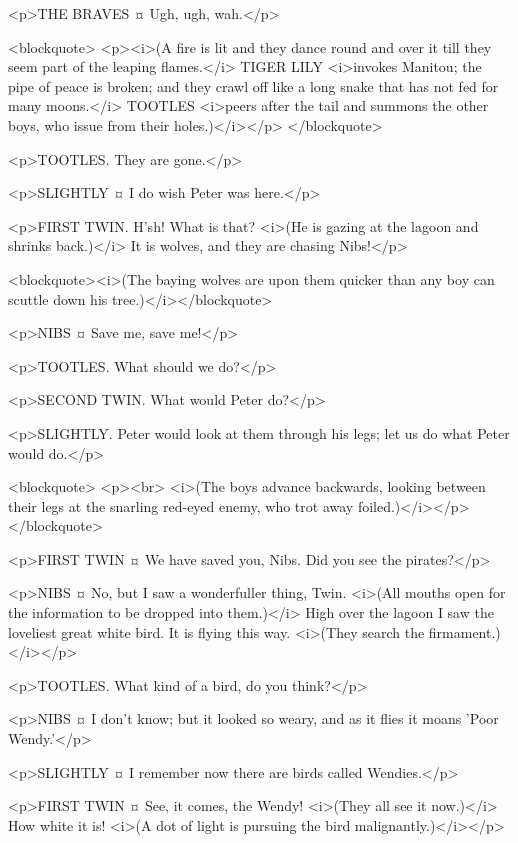 <p>THE BRAVES ¤
Ugh, ugh, wah.</p>

<blockquote> <p><i>(A fire is lit and they dance round and over it till they seem part of the leaping flames.</i> TIGER LILY <i>invokes Manitou; the pipe of peace is broken; and they crawl off like a long snake that has not fed for many moons.</i> TOOTLES <i>peers after the tail and summons the other boys, who issue from their holes.)</i></p> </blockquote>

<p>TOOTLES. They are gone.</p>

<p>SLIGHTLY ¤
I do wish Peter was here.</p>

<p>FIRST TWIN. H'sh! What is that? <i>(He is gazing at the lagoon and shrinks back.)</i> It is wolves, and they are chasing Nibs!</p>

<blockquote><i>(The baying wolves are upon them quicker than any boy can scuttle down his tree.)</i></blockquote>

<p>NIBS ¤
Save me, save me!</p>

<p>TOOTLES. What should we do?</p>

<p>SECOND TWIN. What would Peter do?</p>

<p>SLIGHTLY. Peter would look at them through his legs; let us do what Peter would do.</p>

<blockquote> <p><br> <i>(The boys advance backwards, looking between their legs at the snarling red-eyed enemy, who trot away foiled.)</i></p> </blockquote>

<p>FIRST TWIN ¤
We have saved you, Nibs. Did you see the pirates?</p>

<p>NIBS ¤
No, but I saw a wonderfuller thing, Twin. <i>(All mouths open for the information to be dropped into them.)</i> High over the lagoon I saw the loveliest great white bird. It is flying this way. <i>(They search the firmament.)</i></p>

<p>TOOTLES. What kind of a bird, do you think?</p>

<p>NIBS ¤
I don't know; but it looked so weary, and as it flies it moans 'Poor Wendy.'</p>

<p>SLIGHTLY ¤
I remember now there are birds called Wendies.</p>

<p>FIRST TWIN ¤
See, it comes, the Wendy! <i>(They all see it now.)</i> How white it is! <i>(A dot of light is pursuing the bird malignantly.)</i></p>

